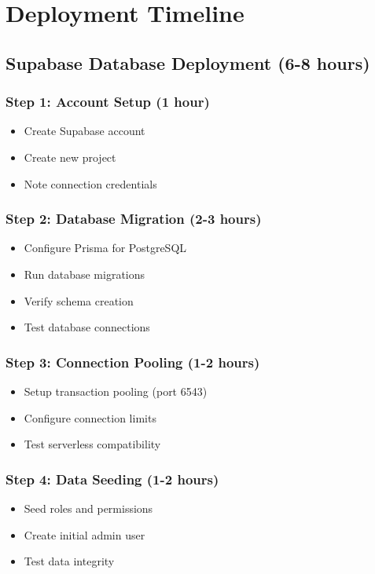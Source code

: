 \documentclass[11pt,a4paper]{article}
\begin{document}
\newpage

\section{Deployment Timeline}

\subsection{Supabase Database Deployment (6-8 hours)}

\subsubsection{Step 1: Account Setup (1 hour)}
\begin{itemize}
    \item Create Supabase account
    \item Create new project
    \item Note connection credentials
\end{itemize}

\subsubsection{Step 2: Database Migration (2-3 hours)}
\begin{itemize}
    \item Configure Prisma for PostgreSQL
    \item Run database migrations
    \item Verify schema creation
    \item Test database connections
\end{itemize}

\subsubsection{Step 3: Connection Pooling (1-2 hours)}
\begin{itemize}
    \item Setup transaction pooling (port 6543)
    \item Configure connection limits
    \item Test serverless compatibility
\end{itemize}

\subsubsection{Step 4: Data Seeding (1-2 hours)}
\begin{itemize}
    \item Seed roles and permissions
    \item Create initial admin user
    \item Test data integrity
\end{itemize}
\end{document}
